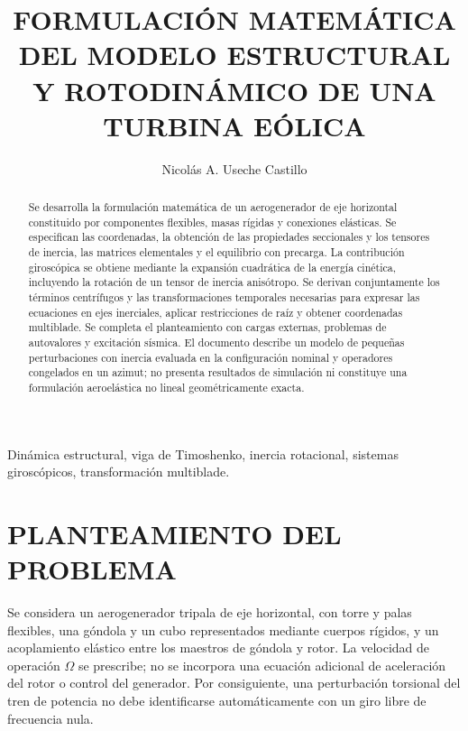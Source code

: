 \documentclass[oneside,a4paper,spanish,links,pagenumbers]{amca}
\title{FORMULACIÓN MATEMÁTICA DEL MODELO ESTRUCTURAL Y ROTODINÁMICO DE UNA TURBINA EÓLICA}
\author{Nicolás A. Useche Castillo}
\affil{Departamento de Ingeniería Mecánica, Universidad de los Andes, Bogotá D.C., Colombia}
\begin{document}
\maketitle
\begin{keywords}
Dinámica estructural, viga de Timoshenko, inercia rotacional, sistemas giroscópicos, transformación multiblade.
\end{keywords}
\par
\begin{abstract}
Se desarrolla la formulación matemática de un aerogenerador de eje horizontal constituido por componentes flexibles, masas rígidas y conexiones elásticas. Se especifican las coordenadas, la obtención de las propiedades seccionales y los tensores de inercia, las matrices elementales y el equilibrio con precarga. La contribución giroscópica se obtiene mediante la expansión cuadrática de la energía cinética, incluyendo la rotación de un tensor de inercia anisótropo. Se derivan conjuntamente los términos centrífugos y las transformaciones temporales necesarias para expresar las ecuaciones en ejes inerciales, aplicar restricciones de raíz y obtener coordenadas multiblade. Se completa el planteamiento con cargas externas, problemas de autovalores y excitación sísmica. El documento describe un modelo de pequeñas perturbaciones con inercia evaluada en la configuración nominal y operadores congelados en un azimut; no presenta resultados de simulación ni constituye una formulación aeroelástica no lineal geométricamente exacta.
\end{abstract}
\tableofcontents
\clearpage

\section{PLANTEAMIENTO DEL PROBLEMA}
\label{sec:problema}
Se considera un aerogenerador tripala de eje horizontal, con torre y palas flexibles, una góndola y un cubo representados mediante cuerpos rígidos, y un acoplamiento elástico entre los maestros de góndola y rotor. La velocidad de operación $\Omega$ se prescribe; no se incorpora una ecuación adicional de aceleración del rotor o control del generador. Por consiguiente, una perturbación torsional del tren de potencia no debe identificarse automáticamente con un giro libre de frecuencia nula.
\end{document}
